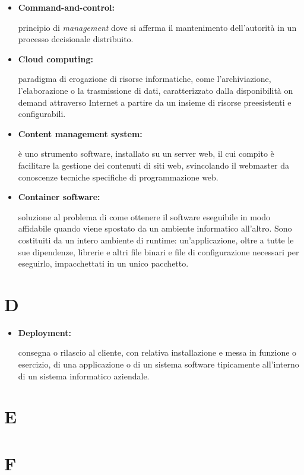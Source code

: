 \begin{itemize}
	\item \hypertarget{cac}{\textbf{Command-and-control:}} principio di \textit{management} dove si afferma il mantenimento dell'autorità in un processo decisionale distribuito.
	
	\item \hypertarget{cc}{\textbf{Cloud computing:}} paradigma di erogazione di risorse informatiche, come l'archiviazione, l'elaborazione o la trasmissione di dati, caratterizzato dalla disponibilità on demand attraverso Internet a partire da un insieme di risorse preesistenti e configurabili.
	
	\item \hypertarget{cms}{\textbf{Content management system:}}  è uno strumento software, installato su un server web, il cui compito è facilitare la gestione dei contenuti di siti web, svincolando il webmaster da conoscenze tecniche specifiche di programmazione web.
	
	\item \hypertarget{cs}{\textbf{Container software:}}  soluzione al problema di come ottenere il software eseguibile in modo affidabile quando viene spostato da un ambiente informatico all'altro. Sono costituiti da un intero ambiente di runtime: un'applicazione, oltre a tutte le sue dipendenze, librerie e altri file binari e file di configurazione necessari per eseguirlo, impacchettati in un unico pacchetto.
	 
\end{itemize}

\section*{D}

\begin{itemize}
	\item \hypertarget{dep}{\textbf{Deployment:}} consegna o rilascio al cliente, con relativa installazione e messa in funzione o esercizio, di una applicazione o di un sistema software tipicamente all'interno di un sistema informatico aziendale.
\end{itemize}

\section*{E}

\section*{F}

